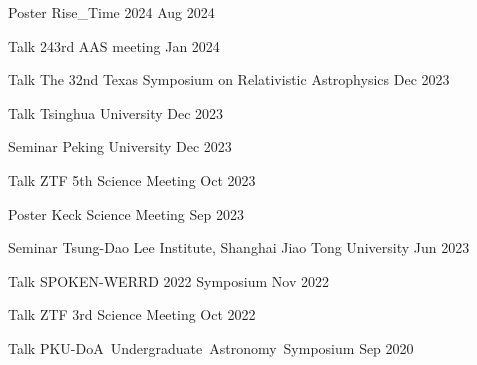 


\begin{cventries}
	
	\cvsimpentry
	{Poster}
	{Rise\_Time 2024}
	{Aug 2024}
	{}

	\cvsimpentry
	{Talk}
	{243rd AAS meeting}
	{Jan 2024}
	{}

	\cvsimpentry
	{Talk}
	{The 32nd Texas Symposium on Relativistic Astrophysics}
	{Dec 2023}
	{}

	\cvsimpentry
	{Talk}
	{Tsinghua University}
	{Dec 2023}
	{}

	\cvsimpentry
	{Seminar}
	{Peking University}
	{Dec 2023}
	{}

	\cvsimpentry
	{Talk}
	{ZTF 5th Science Meeting}
	{Oct 2023}
	{}
	
	\cvsimpentry
	{Poster}
	{Keck Science Meeting}
	{Sep 2023}
	{}

	\cvsimpentry
	{Seminar}
	{Tsung-Dao Lee Institute, Shanghai Jiao Tong University}
	{Jun 2023}
	{}

	\cvsimpentry
	{Talk}
	{SPOKEN-WERRD 2022 Symposium} %
	{Nov 2022} %
	{}

	\cvsimpentry
	{Talk} %
	{ZTF 3rd Science Meeting} %
	{Oct 2022} %
	{}
	
	\cvsimpentry
	{Talk} %
	{PKU-DoA Undergraduate Astronomy Symposium} %
	{Sep 2020} %
	{}

\end{cventries}